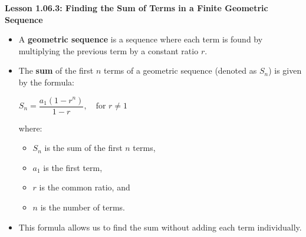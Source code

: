 \begin{center}
\textbf{Lesson 1.06.3: Finding the Sum of Terms in a Finite Geometric Sequence}
\end{center}

\vspace*{-1.5ex}

\begin{itemize}
    \item A \textbf{geometric sequence} is a sequence where each term is found by multiplying the previous term by a constant ratio \( r \).
    \item The \textbf{sum} of the first \( n \) terms of a geometric sequence (denoted as \( S_n \)) is given by the formula:

{\centering $  S_n = \dfrac{a_1(1 - r^n)}{1 - r}, \quad \text{for } r \neq 1  $\par}
          where:
          \begin{multicols}{2}
            \begin{itemize}
  
              \item \( S_n \) is the sum of the first \( n \) terms,
              \item \( a_1 \) is the first term,
              \item \( r \) is the common ratio, and
              \item \( n \) is the number of terms.
            
              \end{itemize}
                  \end{multicols}
    \item This formula allows us to find the sum without adding each term individually.
\end{itemize}
